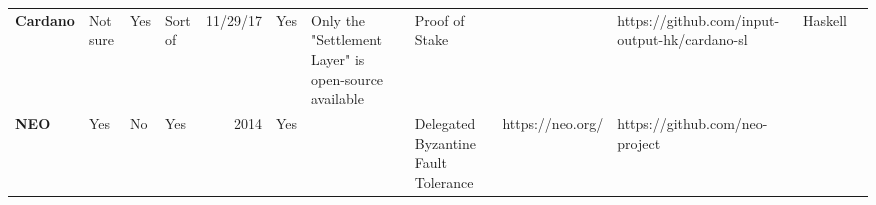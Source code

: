 \begin{table}[htbp]
\begin{adjustbox}{width=25cm, height=6cm, angle=270}
\begin{tabular}{llllrlp{17.915em}rlrrr}
      \rowcolor[rgb]{ .267,  .447,  .769} \textcolor[rgb]{ 1,  1,  1}{\textbf{Cardano}} & \cellcolor[rgb]{ 1,  .922,  .612}\textcolor[rgb]{ .612,  .341,  0}{Not sure} & \cellcolor[rgb]{ .776,  .937,  .808}\textcolor[rgb]{ 0,  .38,  0}{Yes} & \cellcolor[rgb]{ 1,  .922,  .612}\textcolor[rgb]{ .612,  .341,  0}{Sort of} & \cellcolor[rgb]{ .851,  .882,  .949}\textcolor[rgb]{ .188,  .329,  .588}{11/29/17} & \cellcolor[rgb]{ .776,  .937,  .808}\textcolor[rgb]{ 0,  .38,  0}{Yes} & \cellcolor[rgb]{ .851,  .882,  .949}\textcolor[rgb]{ .188,  .329,  .588}{Only the "Settlement Layer" is open-source available} & \multicolumn{1}{l}{\cellcolor[rgb]{ .851,  .882,  .949}\textcolor[rgb]{ .188,  .329,  .588}{Proof of Stake}} & \cellcolor[rgb]{ .851,  .882,  .949}\textcolor[rgb]{ .188,  .329,  .588}{} & \multicolumn{1}{l}{\cellcolor[rgb]{ .851,  .882,  .949}\textcolor[rgb]{ .188,  .329,  .588}{https://github.com/input-output-hk/cardano-sl }} & \multicolumn{1}{l}{\cellcolor[rgb]{ .851,  .882,  .949}\textcolor[rgb]{ .188,  .329,  .588}{Haskell}} & \cellcolor[rgb]{ .851,  .882,  .949}\textcolor[rgb]{ .188,  .329,  .588}{} \\
      \rowcolor[rgb]{ .267,  .447,  .769} \textcolor[rgb]{ 1,  1,  1}{\textbf{NEO}} & \cellcolor[rgb]{ .776,  .937,  .808}\textcolor[rgb]{ 0,  .38,  0}{Yes} & \cellcolor[rgb]{ 1,  .78,  .808}\textcolor[rgb]{ .612,  0,  .024}{No} & \cellcolor[rgb]{ .776,  .937,  .808}\textcolor[rgb]{ 0,  .38,  0}{Yes} & \cellcolor[rgb]{ 1,  1,  1}\textcolor[rgb]{ .188,  .329,  .588}{2014} & \cellcolor[rgb]{ .776,  .937,  .808}\textcolor[rgb]{ 0,  .38,  0}{Yes} & \multicolumn{1}{r}{\cellcolor[rgb]{ 1,  1,  1}\textcolor[rgb]{ .188,  .329,  .588}{}} & \multicolumn{1}{l}{\cellcolor[rgb]{ 1,  1,  1}\textcolor[rgb]{ .188,  .329,  .588}{Delegated Byzantine Fault Tolerance}} & \cellcolor[rgb]{ 1,  1,  1}\textcolor[rgb]{ .188,  .329,  .588}{https://neo.org/} & \multicolumn{1}{l}{\cellcolor[rgb]{ 1,  1,  1}\textcolor[rgb]{ .188,  .329,  .588}{https://github.com/neo-project}} & \cellcolor[rgb]{ 1,  1,  1}\textcolor[rgb]{ .188,  .329,  .588}{} & \cellcolor[rgb]{ 1,  1,  1}\textcolor[rgb]{ .188,  .329,  .588}{} \\

\end{tabular}
\end{adjustbox}
\end{table}

